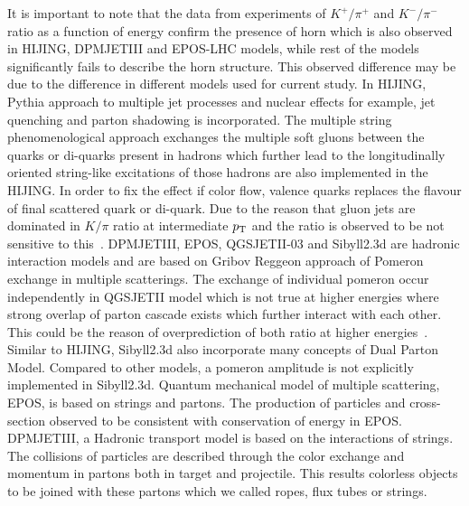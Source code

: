 \documentclass{article}
\newcommand{\ppt}{$p_{\rm T}$}
\begin{document}
It is important to note that the data from experiments of $K^+/\pi^+$ and $K^-/\pi^-$ ratio as a function of energy confirm the presence of horn which is also observed in HIJING, DPMJETIII and EPOS-LHC models, while rest of the models significantly fails to describe the horn structure. This observed difference may be due to the difference in different models used for current study. In HIJING, Pythia approach to multiple jet processes and nuclear effects for example, jet quenching and parton shadowing is incorporated. The multiple string phenomenological approach exchanges the multiple soft gluons between the quarks or di-quarks present in hadrons which further lead to the longitudinally oriented string-like excitations of those hadrons are also implemented in the HIJING. In order to fix the effect if color flow, valence quarks replaces the flavour of final scattered quark or di-quark. Due to the reason that gluon jets are dominated in $K/\pi$ ratio at intermediate {\ppt} and the ratio is observed to be not sensitive to this~\cite{Sjostrand:1987su, Werner:1988yt, Wang:1991hta}. DPMJETIII, EPOS, QGSJETII-03 and Sibyll2.3d are hadronic interaction models and are based on Gribov Reggeon approach of Pomeron exchange in multiple scatterings. The exchange of individual pomeron occur independently in QGSJETII model which is not true at higher energies where strong overlap of parton cascade exists which further interact with each other. This could be the reason of overprediction of both ratio at higher energies~\cite{Thakuria:2012ie}. Similar to HIJING, Sibyll2.3d also incorporate many concepts of Dual Parton Model. Compared to other models, a pomeron amplitude is not explicitly implemented in Sibyll2.3d. Quantum mechanical model of multiple scattering, EPOS, is based on strings and partons. The production of particles and cross-section observed to be consistent with conservation of energy in EPOS. DPMJETIII, a Hadronic transport model is based on the interactions of strings. The collisions of particles are described through the color exchange and momentum in partons both in target and projectile. This results colorless objects to be joined with these partons which we called ropes, flux tubes or strings.     
\end{document}
